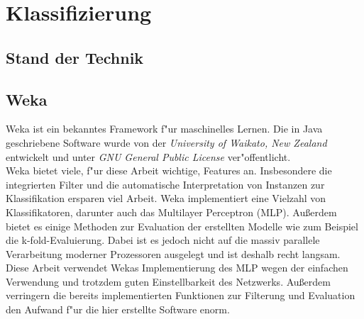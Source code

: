 \section{Klassifizierung}
\label{Klassifizierung}

\subsection{Stand der Technik}
\label{Stand der Technik}

\subsection{Weka}
\label{Weka}
Weka ist ein bekanntes Framework f"ur maschinelles Lernen. Die in Java geschriebene Software wurde von der \textit{University of Waikato, New Zealand} entwickelt und unter \textit{GNU General Public License} ver"offentlicht. \\
Weka bietet viele, f"ur diese Arbeit wichtige, Features an. Insbesondere die integrierten Filter und die automatische Interpretation von Instanzen zur Klassifikation ersparen viel Arbeit. Weka implementiert eine Vielzahl von Klassifikatoren, darunter auch das Multilayer Perceptron (MLP).
Au{\ss}erdem bietet es einige Methoden zur Evaluation der erstellten Modelle wie zum Beispiel die k-fold-Evaluierung. Dabei ist es jedoch nicht auf die massiv parallele Verarbeitung moderner Prozessoren ausgelegt und ist deshalb recht langsam.\\
Diese Arbeit verwendet Wekas Implementierung des MLP wegen der einfachen Verwendung und trotzdem guten Einstellbarkeit des Netzwerks. Au{\ss}erdem verringern die bereits implementierten Funktionen zur Filterung und Evaluation den Aufwand f"ur die hier erstellte Software enorm.

